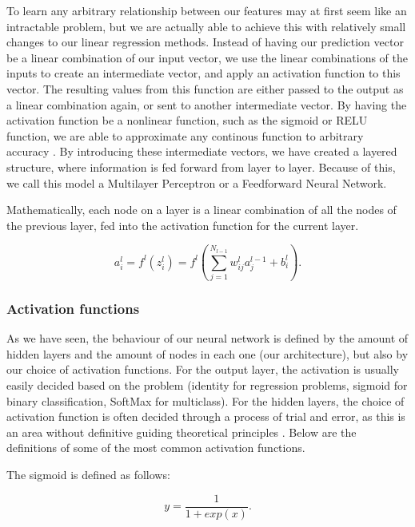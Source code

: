\documentclass[onecolumn,10pt,cleanfoot]{asme2ej}
\begin{document}
To learn any arbitrary relationship between our features may at first seem like an intractable problem, but we are actually able to achieve this with relatively small changes to our linear regression methods. Instead of having our prediction vector be a linear combination of our input vector, we use the linear combinations of the inputs to create an intermediate vector, and apply an activation function to this vector. The resulting values from this function are either passed to the output as a linear combination again, or sent to another intermediate vector. By having the activation function be a nonlinear function, such as the sigmoid or RELU function, we are able to approximate any continous function to arbitrary accuracy \cite[230]{cmb}. By introducing these intermediate vectors, we have created a layered structure, where information is fed forward from layer to layer. Because of this, we call this model a Multilayer Perceptron or a Feedforward Neural Network.

Mathematically, each node on a layer is a linear combination of all the nodes of the previous layer, fed into the activation function for the current layer.

\begin{equation}
a_i^l = f^l(z_i^l) = f^l\left(\sum_{j=1}^{N_{l-1}} w_{ij}^l a_j^{l-1} + b_i^l\right).
\end{equation}

\subsubsection{Activation functions}

As we have seen, the behaviour of our neural network is defined by the amount of hidden layers and the amount of nodes in each one (our architecture), but also by our choice of activation functions. For the output layer, the activation is usually easily decided based on the problem (identity for regression problems, sigmoid for binary classification, SoftMax for multiclass). For the hidden layers, the choice of activation function is often decided through a process of trial and error, as this is an area without definitive guiding theoretical principles \cite[188]{gbc}. Below are the definitions of some of the most common activation functions.

The sigmoid is defined as follows:

\begin{equation}
y = \frac{1}{1 + exp(x)}.
\end{equation}
\end{document}

